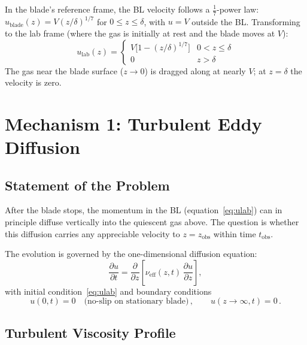 \documentclass[11pt,a4paper]{article}
\begin{document}
In the blade's reference frame, the BL velocity follows a
$\tfrac{1}{7}$-power law: $u_\mathrm{blade}(z) = V(z/\delta)^{1/7}$
for $0 \le z \le \delta$, with $u = V$ outside the BL. Transforming to
the lab frame (where the gas is initially at rest and the blade moves
at $V$):
\begin{equation}
  u_\mathrm{lab}(z) =
  \begin{cases}
    V\bigl[1 - (z/\delta)^{1/7}\bigr] & 0 < z \le \delta \\
    0 & z > \delta
  \end{cases}
  \label{eq:ulab}
\end{equation}
The gas near the blade surface ($z \to 0$) is dragged along at nearly
$V$; at $z = \delta$ the velocity is zero.


\section{Mechanism 1: Turbulent Eddy Diffusion}
\label{sec:eddies}

\subsection{Statement of the Problem}

After the blade stops, the momentum in the BL
(equation~\ref{eq:ulab}) can in principle diffuse vertically into the
quiescent gas above. The question is whether this diffusion carries any
appreciable velocity to $z = z_\mathrm{obs}$ within time
$t_\mathrm{obs}$.

The evolution is governed by the one-dimensional diffusion equation:
\begin{equation}
  \frac{\partial u}{\partial t}
  = \frac{\partial}{\partial z}
    \left[\nu_\mathrm{eff}(z,t)\,\frac{\partial u}{\partial z}\right],
  \label{eq:diffusion}
\end{equation}
with initial condition~\eqref{eq:ulab} and boundary conditions
\begin{equation}
  u(0,t) = 0 \quad\text{(no-slip on stationary blade)}\,,
  \qquad
  u(z \to \infty, t) = 0\,.
\end{equation}

\subsection{Turbulent Viscosity Profile}
\end{document}
